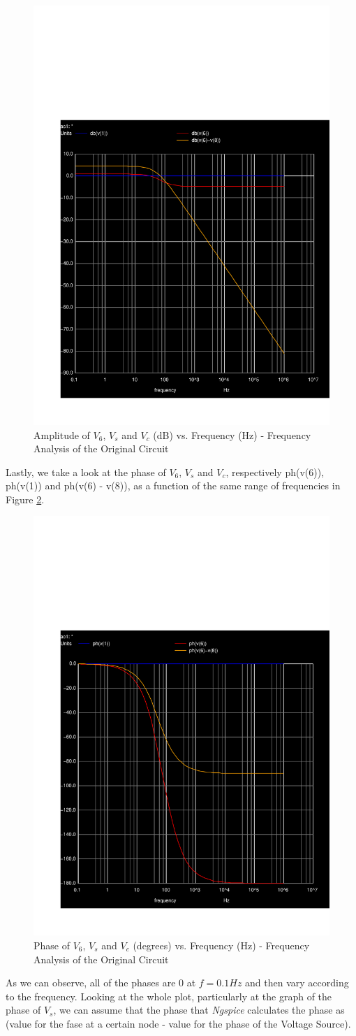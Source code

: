 \begin{figure}[h] \centering
\includegraphics[width=0.4\linewidth]{../sim/db.pdf}
\caption{Amplitude of $V_6$, $V_s$ and $V_c$ (dB) vs. Frequency (Hz) - Frequency Analysis of the Original Circuit}
\label{fig:sim-graph5db}
\end{figure}

Lastly, we take a look at the phase of $V_6$, $V_s$ and $V_c$, respectively ph(v(6)), ph(v(1)) and ph(v(6) - v(8)), as a function of the same range of frequencies in Figure \ref{fig:sim-graph5ph}.

\begin{figure}[h] \centering
\includegraphics[width=0.4\linewidth]{../sim/ph.pdf}
\caption{Phase of $V_6$, $V_s$ and $V_c$ (degrees) vs. Frequency (Hz) - Frequency Analysis of the Original Circuit}
\label{fig:sim-graph5ph}
\end{figure}


As we can observe, all of the phases are 0 at $f=0.1Hz$ and then vary according to the frequency. Looking at the whole plot, particularly at the graph of the phase of $V_s$, we can assume that the phase that \textit{Ngspice} calculates the phase as (value for the fase at a certain node - value for the phase of the Voltage Source).